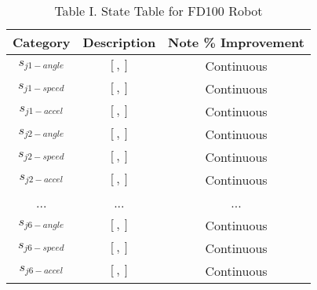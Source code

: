 \documentclass[conference]{IEEEtran}
\begin{document}
\begin{table}[H] %
\renewcommand{\arraystretch}{1.3}
\caption{Table I. State Table for FD100 Robot}
\label{state-Table1}
\centering
\begin{tabular}{|c||c||c|}
\hline
Category     & Description    & Note    \% Improvement \\
\hline
$s_{j1-angle}$     & $[,]$ & Continuous \\
\hline
$s_{j1-speed}$     & $[,]$ & Continuous \\
\hline 
$s_{j1-accel}$     & $[,]$ & Continuous \\
\hline 
$s_{j2-angle}$     & $[,]$ & Continuous \\
\hline
$s_{j2-speed}$     & $[,]$ & Continuous \\
\hline 
$s_{j2-accel}$     & $[,]$ & Continuous \\
\hline 
...     & ... & ... \\
\hline 
$s_{j6-angle}$     & $[,]$ & Continuous \\
\hline
$s_{j6-speed}$     & $[,]$ & Continuous \\
\hline 
$s_{j6-accel}$     & $[,]$ & Continuous \\
\hline 
\end{tabular}
\end{table}
\end{document}
